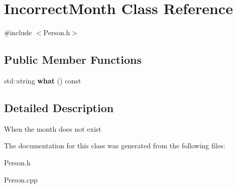 \hypertarget{class_incorrect_month}{}\section{Incorrect\+Month Class Reference}
\label{class_incorrect_month}


{\ttfamily \#include $<$Person.\+h$>$}

\subsection*{Public Member Functions}
\begin{DoxyCompactItemize}
\item 
\mbox{\label{class_incorrect_month_ab5f69a2380802c07d44f2f1c5e6575ed}} 
std\+::string {\bfseries what} () const
\end{DoxyCompactItemize}


\subsection{Detailed Description}
When the month does not exist 

The documentation for this class was generated from the following files\+:\begin{DoxyCompactItemize}
\item 
Person.\+h\item 
Person.\+cpp\end{DoxyCompactItemize}
